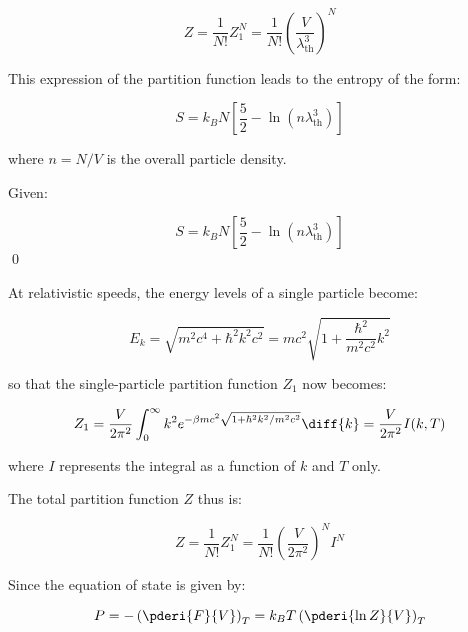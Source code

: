 \documentclass[12pt]{article}
\begin{document}
\begin{equation}
    Z = \frac{1}{N!} Z_{1}^{N} = \frac{1}{N!} \left( \frac{V}{\lambda_{\text{th}}^3} \right)^{N}
\end{equation}

This expression of the partition function leads to the entropy of the form:

\begin{equation}
    S = k_{B} N \left[ \frac{5}{2} - \ln{(n \lambda_{\text{th}}^3)} \right]
\end{equation}

where $n = N/V$ is the overall particle density.


Given:

\begin{equation}
    S = k_{B} N \left[ \frac{5}{2} - \ln{(n \lambda_{\text{th}}^3)} \right]
\end{equation}
\qed



At relativistic speeds, the energy levels of a single particle become:

\begin{equation}
    E_{k} = \sqrt{m^{2} c^{4} + \hbar^{2} k^{2} c^{2}} = m c^{2} \sqrt{1 + \frac{\hbar^{2}}{m^{2} c^{2}} k^{2}}
\end{equation}

so that the single-particle partition function $Z_{1}$ now becomes:

\begin{equation}
    Z_{1} = \frac{V}{2\pi^{2}} \int_{0}^{\infty} k^{2} e^{-\beta m c^{2} \sqrt{1 + \hbar^{2}k^{2}/m^{2}c^{2}}} \diff{k} = \frac{V}{2\pi^{2}} I(k, T)
\end{equation}

where $I$ represents the integral as a function of $k$ and $T$ only.

The total partition function $Z$ thus is:

\begin{equation}
    Z = \frac{1}{N!} Z_{1}^{N} = \frac{1}{N!} \left( \frac{V}{2\pi^{2}} \right)^{N} I^{N}
\end{equation}

Since the equation of state is given by:

\begin{equation}
    P = -\left( \pderi{F}{V} \right)_{T} = k_{B} T \left( \pderi{\ln{Z}}{V} \right)_{T}
\end{equation}
\end{document}
